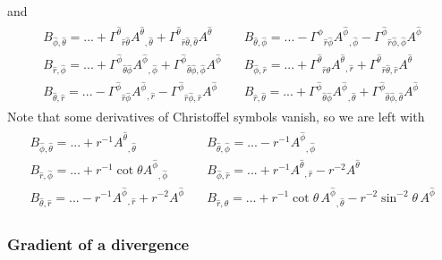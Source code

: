 \documentclass[\mydriver,12pt,twoside,notitlepage,a4paper]{article}
\renewcommand{\vec}[1]{\mbox{\boldmath{$#1$}}}
\newcommand{\grad}    {\vec{\nabla}}
\begin{document}
and
\begin{eqnarray}
\begin{array}{lll}
B_{\hat\phi,\hat\theta}=...
+{\Gamma^{\hat\theta}}_{\hat r\hat\theta}{A^{\hat\theta}}_{,\hat\theta}
+{\Gamma^{\hat\theta}}_{\hat r\hat\theta,\hat\theta}A^{\hat\theta}
\quad&
B_{\hat\theta,\hat\phi}=...
-{\Gamma^{\hat\phi}}_{\hat r\hat\phi}{A^{\hat\phi}}_{,\hat\phi}
-{\Gamma^{\hat\phi}}_{\hat r\hat\phi,\hat\phi}A^{\hat\phi}
\\
B_{\hat r,\hat\phi}=...
+{\Gamma^{\hat\phi}}_{\hat\theta\hat\phi}{A^{\hat\phi}}_{,\hat\phi}
+{\Gamma^{\hat\phi}}_{\hat\theta\hat\phi,\hat\phi}A^{\hat\phi}
\quad&
B_{\hat\phi,\hat r}=...
+{\Gamma^{\hat\theta}}_{\hat r\hat\theta}{A^{\hat\theta}}_{,\hat r}
+{\Gamma^{\hat\theta}}_{\hat r\hat\theta,\hat r}A^{\hat\theta}
\\
B_{\hat\theta,\hat r}=...
-{\Gamma^{\hat\phi}}_{\hat r\hat\phi}{A^{\hat\phi}}_{,\hat r}
-{\Gamma^{\hat\phi}}_{\hat r\hat\phi,\hat r}A^{\hat\phi}
\quad&
B_{\hat r,\hat\theta}=...
+{\Gamma^{\hat\phi}}_{\hat\theta\hat\phi}{A^{\hat\phi}}_{,\hat\theta}
+{\Gamma^{\hat\phi}}_{\hat\theta\hat\phi,\hat\theta}A^{\hat\phi}
\end{array}
\end{eqnarray}
Note that some derivatives of Christoffel symbols vanish, so
we are left with
\begin{eqnarray}
\begin{array}{lll}
B_{\hat\phi,\hat\theta}=...
+r^{-1}{A^{\hat\theta}}_{,\hat\theta}
\quad&
B_{\hat\theta,\hat\phi}=...
-r^{-1}{A^{\hat\phi}}_{,\hat\phi}
\\
B_{\hat r,\hat\phi}=...
+r^{-1} \cot\!\theta {A^{\hat\phi}}_{,\hat\phi}
\quad&
B_{\hat\phi,\hat r}=...
+r^{-1}{A^{\hat\theta}}_{,\hat r}
-r^{-2}A^{\hat\theta}
\\
B_{\hat\theta,\hat r}=...
-r^{-1}{A^{\hat\phi}}_{,\hat r}
+r^{-2}A^{\hat\phi}
\quad&
B_{\hat r,\hat\theta}=...
+r^{-1} \cot\!\theta\, {A^{\hat\phi}}_{,\hat\theta}
-r^{-2}\sin^{-2}\!\theta\, A^{\hat\phi}
\end{array}
\end{eqnarray}

\subsubsection{Gradient of a divergence}
\end{document}
